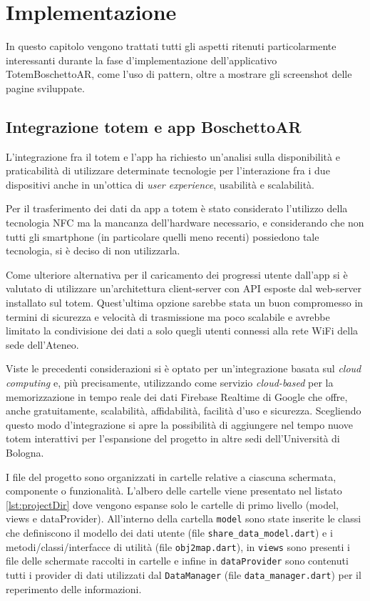 \chapter{Implementazione}
In questo capitolo vengono trattati tutti gli aspetti ritenuti particolarmente interessanti durante la fase d'implementazione dell'applicativo TotemBoschettoAR, come l'uso di pattern, oltre a mostrare gli screenshot delle pagine sviluppate.

\section{Integrazione totem e app BoschettoAR}
L'integrazione fra il totem e l'app ha richiesto un'analisi sulla disponibilità e praticabilità di utilizzare determinate tecnologie per l'interazione fra i due dispositivi anche in un'ottica di \textit{user experience}, usabilità e scalabilità.

Per il trasferimento dei dati da app a totem è stato considerato l'utilizzo della tecnologia NFC ma la mancanza dell'hardware necessario, e considerando che non tutti gli smartphone (in particolare quelli meno recenti) possiedono tale tecnologia, si è deciso di non utilizzarla.

Come ulteriore alternativa per il caricamento dei progressi utente dall'app si è valutato di utilizzare un'architettura client-server con API esposte dal web-server installato sul totem. Quest'ultima opzione sarebbe stata un buon compromesso in termini di sicurezza e velocità di trasmissione ma poco scalabile e avrebbe limitato la condivisione dei dati a solo quegli utenti connessi alla rete WiFi della sede dell'Ateneo.

Viste le precedenti considerazioni si è optato per un'integrazione basata sul \textit{cloud computing} e, più precisamente, utilizzando come servizio \textit{cloud-based} per la memorizzazione in tempo reale dei dati Firebase Realtime di Google \cite{firebase} che offre, anche gratuitamente, scalabilità, affidabilità, facilità d'uso e sicurezza.
Scegliendo questo modo d'integrazione si apre la possibilità di aggiungere nel tempo nuove totem interattivi per l'espansione del progetto in altre sedi dell'Università di Bologna.

I file del progetto sono organizzati in cartelle relative a ciascuna schermata, componente o funzionalità. L'albero delle cartelle viene presentato nel listato \ref{lst:projectDir} dove vengono espanse solo le cartelle di primo livello (model, views e dataProvider). All'interno della cartella \texttt{model} sono state inserite le classi che definiscono il modello dei dati utente (file \texttt{share\_data\_model.dart}) e i metodi/classi/interfacce di utilità (file \texttt{obj2map.dart}), in \texttt{views} sono presenti i file delle schermate raccolti in cartelle e infine in \texttt{dataProvider} sono contenuti tutti i provider di dati utilizzati dal \texttt{DataManager} (file \texttt{data\_manager.dart}) per il reperimento delle informazioni.

